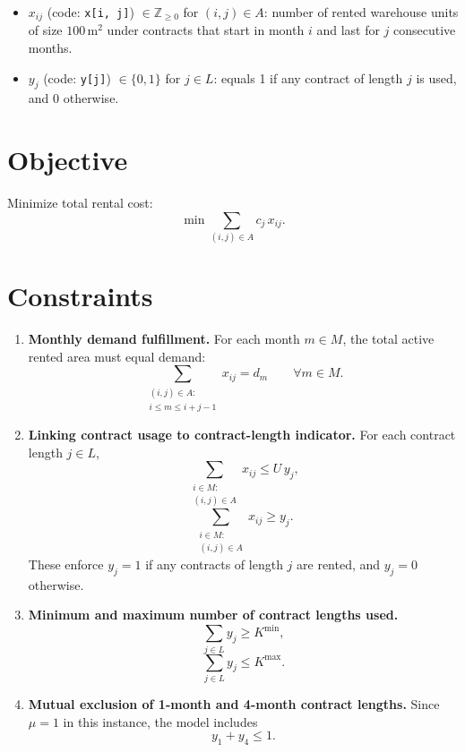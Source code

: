 \begin{itemize}
    \item $x_{ij}$ (code: \texttt{x[i, j]}) $\in \mathbb{Z}_{\ge 0}$ for $(i,j)\in A$: number of rented warehouse units of size $100\,\text{m}^2$ under contracts that start in month $i$ and last for $j$ consecutive months.
    \item $y_j$ (code: \texttt{y[j]}) $\in \{0,1\}$ for $j\in L$: equals 1 if any contract of length $j$ is used, and 0 otherwise.
\end{itemize}

\section*{Objective}

Minimize total rental cost:
\[
\min \sum_{(i,j)\in A} c_j\,x_{ij}.
\]

\section*{Constraints}

\begin{enumerate}
    \item \textbf{Monthly demand fulfillment.} For each month $m\in M$, the total active rented area must equal demand:
    \[
    \sum_{\substack{(i,j)\in A:\\ i \le m \le i+j-1}} x_{ij} = d_m
    \qquad \forall m\in M.
    \]

    \item \textbf{Linking contract usage to contract-length indicator.} For each contract length $j\in L$,
    \[
    \sum_{\substack{i\in M:\\ (i,j)\in A}} x_{ij} \le U\,y_j,
    \]
    \[
    \sum_{\substack{i\in M:\\ (i,j)\in A}} x_{ij} \ge y_j.
    \]
    These enforce $y_j=1$ if any contracts of length $j$ are rented, and $y_j=0$ otherwise.

    \item \textbf{Minimum and maximum number of contract lengths used.}
    \[
    \sum_{j\in L} y_j \ge K^{\min},
    \]
    \[
    \sum_{j\in L} y_j \le K^{\max}.
    \]

    \item \textbf{Mutual exclusion of 1-month and 4-month contract lengths.}
    Since $\mu=1$ in this instance, the model includes
    \[
    y_1 + y_4 \le 1.
    \]
\end{enumerate}

